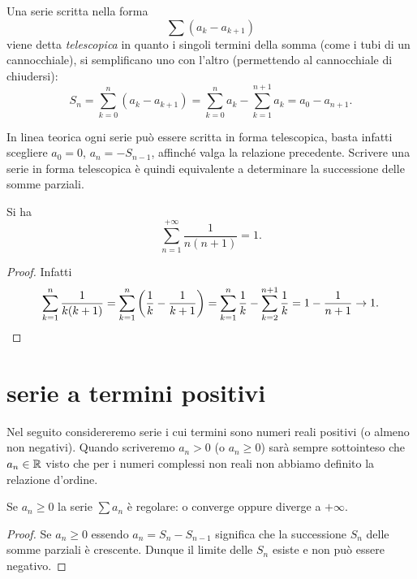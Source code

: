 Una serie scritta nella forma
\[
  \sum (a_{k} - a_{k+1})
\]
viene detta \emph{telescopica}
%
in quanto i singoli termini della somma (come i tubi di un cannocchiale),
si semplificano uno con l'altro (permettendo al cannocchiale di chiudersi):
\[
  S_n = \sum_{k=0}^n (a_{k} - a_{k+1})
  = \sum_{k=0}^{n} a_k - \sum_{k=1}^{n+1} a_k
  = a_0 - a_{n+1}.
\]

In linea teorica ogni serie può essere scritta in forma telescopica, basta infatti scegliere $a_0=0$, $a_n = -S_{n-1}$, affinché valga la relazione precedente. Scrivere una serie in forma telescopica è quindi equivalente a determinare la successione delle somme parziali.

\begin{example}
\mymark{**}
Si ha
\[
  \sum_{n=1}^{+\infty} \frac{1}{n(n+1)} = 1.
\]
\end{example}
%
\begin{proof}
\mymark{**}
Infatti
\[
  \sum_{k=1}^n \frac{1}{k(k+1)}
  = \sum_{k=1}^n {\left( \frac{1}{k} - \frac{1}{k+1} \right)}
  = \sum_{k=1}^n \frac{1}{k} - \sum_{k=2}^{n+1} \frac{1}{k}
  = 1 - \frac{1}{n+1} \to 1.
\]
\end{proof}

\section{serie a termini positivi}

Nel seguito considereremo serie i cui termini sono numeri reali
positivi (o almeno non negativi).
Quando scriveremo $a_n >0$ (o $a_n \ge 0$) sarà sempre
sottointeso che $a_n\in {\mathbb R}$ visto che per i numeri complessi non
reali non abbiamo definito la relazione d'ordine.

\begin{theorem}\label{th:serie_positiva}
\mymark{***}%
%
%
Se $a_n\ge 0$
la serie $\sum a_n$ è regolare:
o converge oppure diverge a $+\infty$.
\end{theorem}
%
\begin{proof}
\mymark{***}
Se $a_n \ge 0$ essendo $a_n = S_n - S_{n-1}$ significa che
la successione $S_n$ delle somme parziali è crescente.
Dunque il limite delle $S_n$ esiste e non può essere negativo.
\end{proof}

